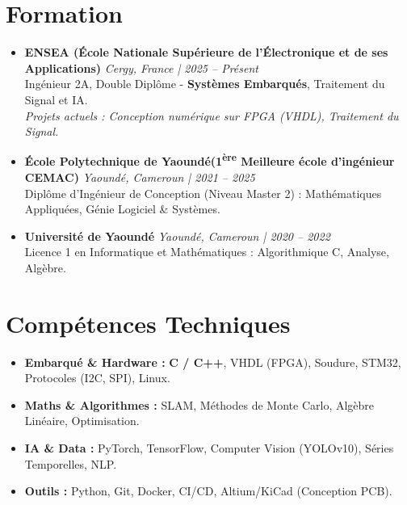 \documentclass[a4paper,11pt]{article}
\begin{document}
\section{Formation}
\begin{itemize}[leftmargin=*, label=\tiny$\bullet$, nosep]
    \item \textbf{ENSEA (École Nationale Supérieure de l'Électronique et de ses Applications)} \hfill \textit{Cergy, France | 2025 -- Présent} \\
    \small{Ingénieur 2A, Double Diplôme - \textbf{Systèmes Embarqués}, Traitement du Signal et IA.} \\
    \textit{\small{Projets actuels : Conception numérique sur FPGA (VHDL), Traitement du Signal.}}
    \vspace{2pt}
     \item \textbf{École Polytechnique de Yaoundé(1\textsuperscript{ère} Meilleure école d'ingénieur CEMAC)} \hfill \textit{Yaoundé, Cameroun | 2021 -- 2025} \\
    \small{Diplôme d'Ingénieur de Conception (Niveau Master 2) : Mathématiques Appliquées, Génie Logiciel \& Systèmes.}
    \item \textbf{Université de Yaoundé} \hfill \textit{Yaoundé, Cameroun | 2020 -- 2022} \\
    \small{Licence 1 en Informatique et Mathématiques : Algorithmique C, Analyse, Algèbre.}
\end{itemize}

\section{Compétences Techniques}
\begin{itemize}[leftmargin=*, nosep]
    \item \small{\textbf{Embarqué \& Hardware :} \textbf{C / C++}, VHDL (FPGA), Soudure, STM32, Protocoles (I2C, SPI), Linux.}
    \item \small{\textbf{Maths \& Algorithmes :} SLAM, Méthodes de Monte Carlo, Algèbre Linéaire, Optimisation.}
    \item \small{\textbf{IA \& Data :} PyTorch, TensorFlow, Computer Vision (YOLOv10), Séries Temporelles, NLP.}
    \item \small{\textbf{Outils :} Python, Git, Docker, CI/CD, Altium/KiCad (Conception PCB).}
\end{itemize}

\end{document}
